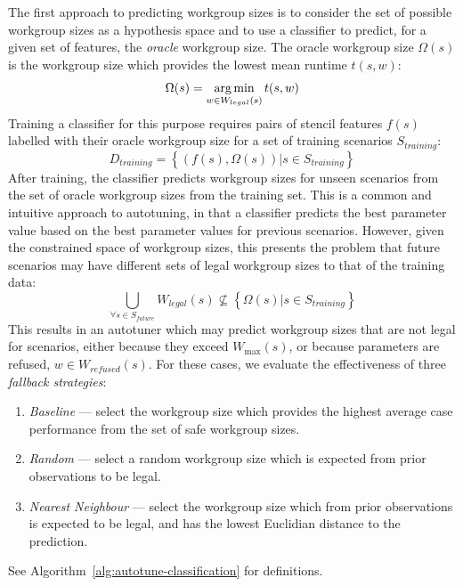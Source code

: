 \documentclass[preprint,nonatbib,10pt]{sigplanconf}
\begin{document}
The first approach to predicting workgroup sizes is to consider the
set of possible workgroup sizes as a hypothesis space and to use a
classifier to predict, for a given set of features, the \emph{oracle}
workgroup size. The oracle workgroup size $\Omega(s)$ is the workgroup
size which provides the lowest mean runtime $t(s,w)$:
%
\begin{equation}
  \Omega(s) = \operatorname*{arg\,min}_{w \in W_{legal}(s)} t(s,w)
\end{equation}
%
Training a classifier for this purpose requires pairs of stencil
features $f(s)$ labelled with their oracle workgroup size for a set of
training scenarios $S_{training}$:
%
\begin{equation}
  D_{training} = \left\{ \left(f(s), \Omega(s)\right) | s \in S_{training} \right\}
\end{equation}
%
After training, the classifier predicts workgroup sizes for unseen
scenarios from the set of oracle workgroup sizes from the training
set. This is a common and intuitive approach to autotuning, in that a
classifier predicts the best parameter value based on the best
parameter values for previous scenarios. However, given the
constrained space of workgroup sizes, this presents the problem that
future scenarios may have different sets of legal workgroup sizes to
that of the training data:
%
\begin{equation}
  \bigcup_{\forall s \in S_{future}} W_{legal}(s) \nsubseteq \left\{ \Omega(s) | s \in S_{training} \right\}
\end{equation}
%
This results in an autotuner which may predict workgroup sizes that
are not legal for scenarios, either because they exceed $W_{\max}(s)$,
or because parameters are refused, $w \in W_{refused}(s)$. For these
cases, we evaluate the effectiveness of three \emph{fallback
  strategies}:
%
\begin{enumerate}
\item \emph{Baseline} --- select the workgroup size which provides the
  highest average case performance from the set of safe workgroup sizes.
\item \emph{Random} --- select a random workgroup size which is
  expected from prior observations to be legal.
\item \emph{Nearest Neighbour} --- select the workgroup size which
  from prior observations is expected to be legal, and has the lowest
  Euclidian distance to the prediction.
\end{enumerate}
%
See Algorithm~\ref{alg:autotune-classification} for definitions.
\end{document}
